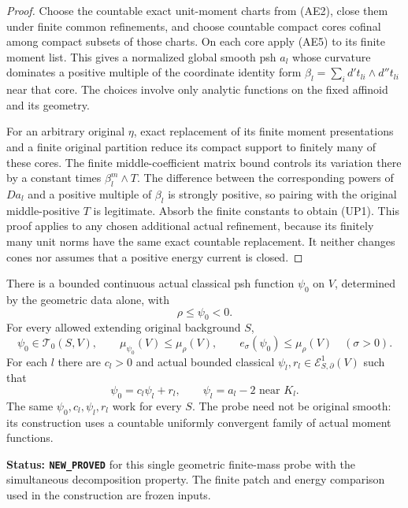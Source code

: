 \begin{proof}
Choose the countable exact unit-moment charts from (AE2), close
them under finite common refinements, and choose countable compact
cores cofinal among compact subsets of those charts.  On each core
apply (AE5) to its finite moment list.  This gives a normalized
global smooth psh $a_l$ whose curvature dominates a positive
multiple of the coordinate identity form
$\beta_l=\sum_i d't_{li}\wedge d''t_{li}$ near that core.
The choices involve only analytic functions on the fixed affinoid
and its geometry.

For an arbitrary original $\eta$, exact replacement of its finite
moment presentations and a finite original partition reduce its
compact support to finitely many of these cores.  The finite
middle-coefficient matrix bound controls its variation there by
a constant times $\beta_l^m\wedge T$.  The difference between
the corresponding powers of $Da_l$ and a positive multiple of
$\beta_l$ is strongly positive, so pairing with the original
middle-positive $T$ is legitimate.  Absorb the finite constants
to obtain (UP1).  This proof applies to any chosen additional
actual refinement, because its finitely many unit norms have the
same exact countable replacement.  It neither changes cones nor
assumes that a positive energy current is closed.
\end{proof}

\begin{theorem}
\label{thm:r12-geometric-finite-mass-probe}
There is a bounded continuous actual classical psh function
$\psi_0$ on $V$, determined by the geometric data alone, with
\[
                         \rho\leq\psi_0<0.
 \tag{UP2}
\]
For every allowed extending original background $S$,
\[
 \psi_0\in\mathscr T_0(S,V),\qquad
 \mu_{\psi_0}(V)\leq\mu_\rho(V),\qquad
 e_\sigma(\psi_0)\leq\mu_\rho(V)\quad(\sigma>0).
 \tag{UP3}
\]
For each $l$ there are $c_l>0$ and actual bounded classical
$\psi_l,r_l\in\mathcal E^1_{S,\partial}(V)$ such that
\[
 \psi_0=c_l\psi_l+r_l,\qquad
            \psi_l=a_l-2\text{ near }K_l.
 \tag{UP4}
\]
The same $\psi_0,c_l,\psi_l,r_l$ work for every $S$.
The probe need not be original smooth: its construction uses a
countable uniformly convergent family of actual moment functions.
\end{theorem}

\noindent\textbf{Status: \texttt{NEW\_PROVED}} for this single
geometric finite-mass probe with the simultaneous decomposition
property.  The finite patch and energy comparison used in the
construction are frozen inputs.

